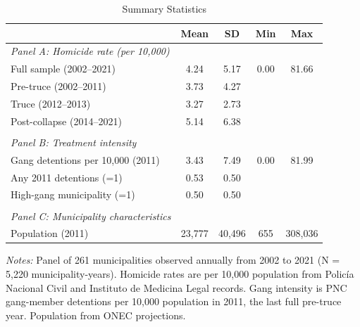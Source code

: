 \begin{table}[H]
\centering
\caption{Summary Statistics}
\label{tab:summary}
\begin{threeparttable}
\begin{tabular}{lcccc}
\toprule
 & Mean & SD & Min & Max \\
\midrule
\textit{Panel A: Homicide rate (per 10,000)} \\
Full sample (2002--2021) & 4.24 & 5.17 & 0.00 & 81.66 \\
Pre-truce (2002--2011) & 3.73 & 4.27 & & \\
Truce (2012--2013) & 3.27 & 2.73 & & \\
Post-collapse (2014--2021) & 5.14 & 6.38 & & \\
\\
\textit{Panel B: Treatment intensity} \\
Gang detentions per 10,000 (2011) & 3.43 & 7.49 & 0.00 & 81.99 \\
Any 2011 detentions (=1) & 0.53 & 0.50 & & \\
High-gang municipality (=1) & 0.50 & 0.50 & & \\
\\
\textit{Panel C: Municipality characteristics} \\
Population (2011) & 23,777 & 40,496 & 655 & 308,036 \\
\bottomrule
\end{tabular}
\begin{tablenotes}[flushleft]
\small
\item \textit{Notes:} Panel of 261 municipalities observed annually from 2002 to 2021 (N = 5,220 municipality-years). Homicide rates are per 10,000 population from Polic\'{i}a Nacional Civil and Instituto de Medicina Legal records. Gang intensity is PNC gang-member detentions per 10,000 population in 2011, the last full pre-truce year. Population from ONEC projections.
\end{tablenotes}
\end{threeparttable}
\end{table}
